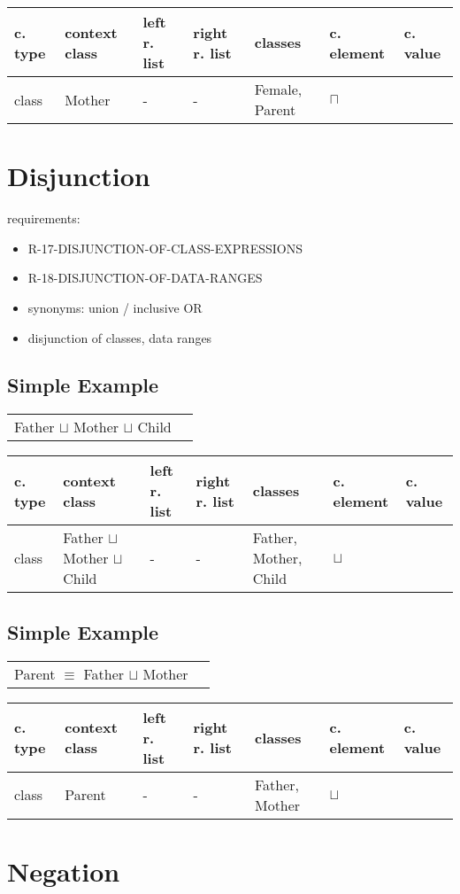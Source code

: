 \documentclass{llncs}
\newenvironment{gcotable}{
  \scriptsize
  \sffamily
  \vspace{0.3cm}
	\begin{center}
  \begin{tabular}{l|l|l|l|l|l|l}
  \hline
  \textbf{c. type} & \textbf{context class} & \textbf{left r. list} & \textbf{right r. list} & \textbf{classes} & \textbf{c. element} & \textbf{c. value} \\
  \hline

}{
  \hline
  \end{tabular}
	\end{center}
}
\newenvironment{DL}{
	\begin{center}
  \begin{tabular}{r l}

}{
  \end{tabular}
	\end{center}
}
\begin{document}
\begin{gcotable}
class & Mother & - & - & Female, Parent & $\sqcap$ \\
\end{gcotable}

\section{Disjunction}

requirements:

\begin{itemize}
	\item R-17-DISJUNCTION-OF-CLASS-EXPRESSIONS
	\item R-18-DISJUNCTION-OF-DATA-RANGES
\end{itemize}



\begin{itemize}
	\item synonyms: union / inclusive OR
	\item disjunction of classes, data ranges
\end{itemize}

\subsection{Simple Example}

\begin{DL}
Father $\sqcup$ Mother $\sqcup$ Child
\end{DL}

\begin{gcotable}
class & Father $\sqcup$ Mother $\sqcup$ Child & - & - & Father, Mother, Child & $\sqcup$ \\
\end{gcotable}

\subsection{Simple Example}

\begin{DL}
Parent $\equiv$ Father $\sqcup$ Mother
\end{DL}

\begin{gcotable}
class & Parent & - & - & Father, Mother & $\sqcup$ \\
\end{gcotable}

\section{Negation}
\end{document}
